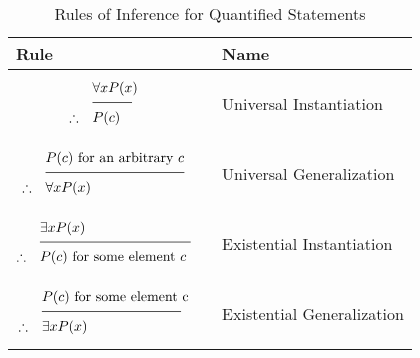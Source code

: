 \begin{table}[H]
	\centering
\begin{tabular}{m{}m{}}
\textbf{Rule} & \textbf{Name} \\ \toprule

\begin{equation*}
\setlength{\jot}{-0.05cm}
\begin{aligned}
&\forall x P(x)&\\
&\rule[0.1cm]{1cm}{0.5pt} & \\
\therefore \quad &P(c)& \\
\end{aligned}
\end{equation*}   & Universal Instantiation \\\midrule

\begin{equation*}
\setlength{\jot}{-0.05cm}
\begin{aligned}
&P(c) \text{ for an arbitrary } c&\\
&\rule[0.1cm]{3.5cm}{0.5pt} & \\
\therefore \quad &\forall x P(x)& \\
\end{aligned}
\end{equation*}  & Universal Generalization \\\midrule

\begin{equation*}
\setlength{\jot}{-0.05cm}
\begin{aligned}
&\exists x P(x)&\\
&\rule[0.1cm]{3.8cm}{0.5pt} & \\
\therefore \quad &P(c) \text{ for some element } c& \\
\end{aligned}
\end{equation*}   & Existential Instantiation \\\midrule

\begin{equation*}
\setlength{\jot}{-0.05cm}
\begin{aligned}
&P(c) \text{ for some element c}&\\
&\rule[0.1cm]{3.5cm}{0.5pt} & \\
\therefore \quad &\exists x P(x)& \\
\end{aligned}
\end{equation*}   & Existential Generalization \\\midrule
\end{tabular}
\caption{Rules of Inference for Quantified Statements}\label{tab:rulesinfquant}
\end{table}